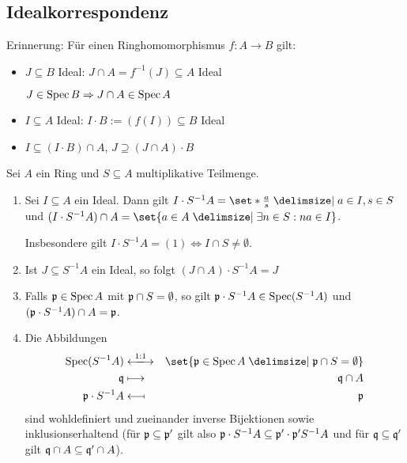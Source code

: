 \documentclass[12pt,a4paper]{scrartcl}
\theoremstyle{cplain}
\theoremstyle{cdef}
\begin{document}
\subsection{Idealkorrespondenz}
Erinnerung: Für einen Ringhomomorphismus $f\colon A\to B$ gilt:
\begin{itemize}
	\item $J\subseteq B$ Ideal: $J\cap A = f^{-1}(J)\subseteq A$ Ideal
	
	$J\in \operatorname{Spec} B \Rightarrow J\cap A \in \operatorname{Spec} A$
	\item $I\subseteq A$ Ideal: $I\cdot B := (f(I)) \subseteq B$ Ideal
	\item $I \subseteq (I\cdot B) \cap A$, $J \supseteq (J\cap A)\cdot B$
\end{itemize}
\begin{satz}
	Sei $A$ ein Ring und $S\subseteq A$ multiplikative Teilmenge.
	\begin{enumerate}
		\item Sei $I\subseteq A$ ein Ideal. Dann gilt $I\cdot S^{-1}A = \set*{\frac{a}{s}\given a\in I, s\in S}$ und $(I\cdot S^{-1}A)\cap A = \set{a\in A\given \exists n\in S: na \in I}$.
		
		Insbesondere gilt $I\cdot S^{-1}A = (1)\Leftrightarrow I\cap S\neq \emptyset$.
		\item Ist $J\subseteq S^{-1}A$ ein Ideal, so folgt $(J\cap A)\cdot S^{-1}A = J$
		\item Falls $\mathfrak{p}\in\operatorname{Spec} A$ mit $\mathfrak{p}\cap S = \emptyset$, so gilt $\mathfrak{p}\cdot S^{-1}A\in \operatorname{Spec} (S^{-1}A)$ und $(\mathfrak{p}\cdot S^{-1}A)\cap A = \mathfrak{p}$.
		\item Die Abbildungen
		\begin{eqnarray*}
			\Spec(S^{-1}A) &\xlongleftrightarrow{1:1}& \set{\fp\in \Spec A \given \fp\cap S = \emptyset} \\
			\fq &\longmapsto& \fq\cap A \\
			\fp\cdot S^{-1}A &\longmapsfrom& \fp
		\end{eqnarray*}
		sind wohldefiniert und zueinander inverse Bijektionen sowie inklusionserhaltend (für $\mathfrak{p}\subseteq \mathfrak{p}'$ gilt also $\mathfrak{p}\cdot S^{-1}A\subseteq \mathfrak{p}'\cdot \mathfrak{p}'S^{-1}A$ und für $\mathfrak{q}\subseteq \mathfrak{q}'$ gilt $\mathfrak{q}\cap A\subseteq \mathfrak{q}'\cap A$).
	\end{enumerate}
\end{satz}
\end{document}
